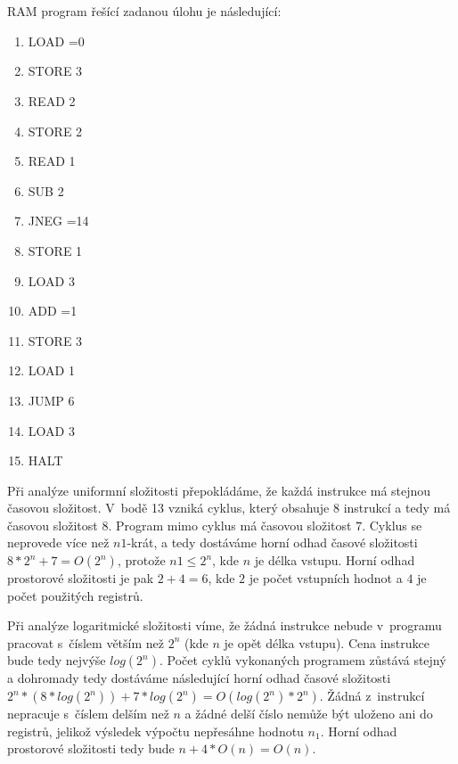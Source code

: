 \documentclass[a4paper]{article}
\begin{document}
\section*{}
RAM program řešící zadanou úlohu je následující:
\begin{enumerate}
    \item LOAD =0
    \item STORE 3
    \item READ 2
    \item STORE 2
    \item READ 1
    \item SUB 2
    \item JNEG =14
    \item STORE 1
    \item LOAD 3
    \item ADD =1
    \item STORE 3
    \item LOAD 1
    \item JUMP 6
    \item LOAD 3
    \item HALT
\end{enumerate}

Při analýze uniformní složitosti přepokládáme, že každá instrukce má stejnou časovou složitost.
V~bodě 13 vzniká cyklus, který obsahuje $8$ instrukcí a tedy má časovou složitost $8$. Program mimo cyklus má časovou složitost $7$.
Cyklus se neprovede více než $n1$-krát, a tedy dostáváme horní odhad časové složitosti $8*2^n+7=O(2^{n})$,
protože $n1 \leq 2^n$, kde $n$ je délka vstupu.
Horní odhad prostorové složitosti je pak $2+4=6$, kde $2$ je počet vstupních hodnot a $4$ je počet použitých registrů. 

Při analýze logaritmické složitosti víme, že žádná instrukce nebude v~programu pracovat s~číslem větším než $2^n$
(kde $n$ je opět délka vstupu).
Cena instrukce bude tedy nejvýše $log(2^n)$.
Počet cyklů vykonaných programem zůstává stejný a dohromady tedy dostáváme následující horní odhad časové složitosti
$2^n*(8*log(2^n))+7*log(2^n)=O(log(2^n)*2^n)$.
Žádná z~instrukcí nepracuje s~číslem delším než $n$ a žádné delší číslo nemůže být uloženo ani do registrů, jelikož výsledek výpočtu
nepřesáhne hodnotu $n_1$. Horní odhad prostorové složitosti tedy bude $n+4*O(n)=O(n)$.
\end{document}
